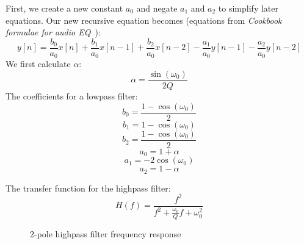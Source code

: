 \documentclass[11pt,a4paper]{article}
\begin{document}
First, we create a new constant $a_0$ and negate $a_1$ and $a_2$ to simplify later equations. Our new recursive equation becomes (equations from \emph{Cookbook formulae for audio EQ}~\cite{Cookbook}):
\begin{equation}
y[n] = \frac{b_0}{a_0}x[n] + \frac{b_1}{a_0}x[n-1] + \frac{b_2}{a_0}x[n-2] - \frac{a_1}{a_0}y[n-1] - \frac{a_2}{a_0}y[n-2]
\end{equation}
We first calculate $\alpha$:
\begin{equation}
\alpha = \frac{\sin(\omega_0)}{2Q}
\end{equation}
The coefficients for a lowpass filter:
\begin{equation}
b_0 = \frac{1 - \cos(\omega_0)}{2}
\end{equation}
\begin{equation}
b_1 = 1 - \cos(\omega_0)
\end{equation}
\begin{equation}
b_2 = \frac{1 - \cos(\omega_0)}{2}
\end{equation}
\begin{equation}
a_0 = 1 + \alpha
\end{equation}
\begin{equation}
a_1 = -2\cos(\omega_0)
\end{equation}
\begin{equation}
a_2 = 1 - \alpha
\end{equation}

The transfer function for the highpass filter:
\begin{equation}
H(f) = \frac{f^2}{f^2 + \frac{\omega_0}{Q}f + \omega_0^2}
\end{equation}


\begin{figure}[ht]
\caption{2-pole highpass filter frequency response}
\centering
{}

\end{figure}
\end{document}
